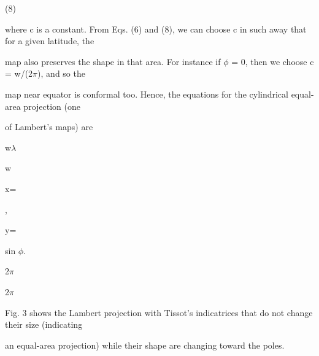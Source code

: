 \documentclass[a4paper,portrait,12pt]{article}
\begin{document}
(8)





\begin{flushleft}
where c is a constant. From Eqs. (6) and (8), we can choose c in such away that for a given latitude, the
\end{flushleft}


\begin{flushleft}
map also preserves the shape in that area. For instance if $\phi$ = 0, then we choose c = w/(2$\pi$), and so the
\end{flushleft}


\begin{flushleft}
map near equator is conformal too. Hence, the equations for the cylindrical equal-area projection (one
\end{flushleft}


\begin{flushleft}
of Lambert's maps) are
\end{flushleft}


\begin{flushleft}
w$\lambda$
\end{flushleft}


\begin{flushleft}
w
\end{flushleft}


\begin{flushleft}
x=
\end{flushleft}


,


\begin{flushleft}
y=
\end{flushleft}


\begin{flushleft}
sin $\phi$.
\end{flushleft}


\begin{flushleft}
2$\pi$
\end{flushleft}


\begin{flushleft}
2$\pi$
\end{flushleft}


\begin{flushleft}
Fig. 3 shows the Lambert projection with Tissot's indicatrices that do not change their size (indicating
\end{flushleft}


\begin{flushleft}
an equal-area projection) while their shape are changing toward the poles.
\end{flushleft}
\end{document}
